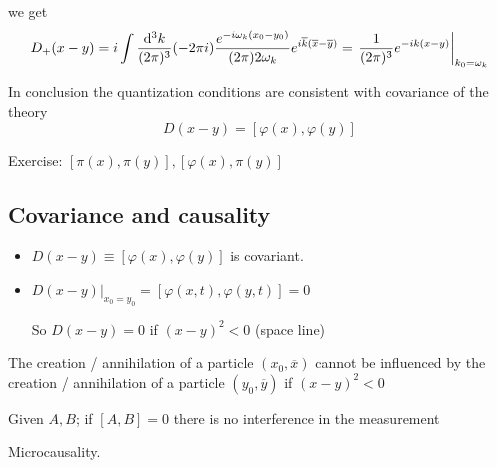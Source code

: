 \begin{figure}
\centering
{}
\end{figure}

we get
\[D_+(x-y) = i \int \frac{\operatorname{d \!}{^3k}}{(2\pi)^3}(-2\pi i) \frac{e^{-i\omega_k(x_0-y_0)}}{(2\pi)2\omega_k}e^{i \overline{k}(\overline{x} - \overline{y})} = \left.\frac{1}{(2\pi)^3}e^{-ik(x-y)}\right|_{k_0=\omega_k} \]

In conclusion the quantization conditions are consistent with covariance of the theory
\[ D(x-y) = [\varphi(x), \varphi(y)] \]
\begin{example}
Exercise: $[\pi(x), \pi(y)], [\varphi(x), \pi(y)]$
\end{example}

\subsection{Covariance and causality}
\begin{itemize}
\item $D(x-y) \equiv [\varphi(x),\varphi(y)]$ is covariant.
\item $\left.D(x-y)\right|_{x_0=y_0} = [\varphi(x,t), \varphi(y,t)] = 0$

So $D(x-y) = 0$ if $(x-y)^2<0$ (space line)
\end{itemize}

The creation / annihilation of a particle $(x_0, \overline{x})$ cannot be influenced by the creation / annihilation of a particle $(y_0,\overline{y})$ if $(x-y)^2<0$

Given $A,B$; if $[A,B] = 0$ there is no interference in the measurement

Microcausality.

